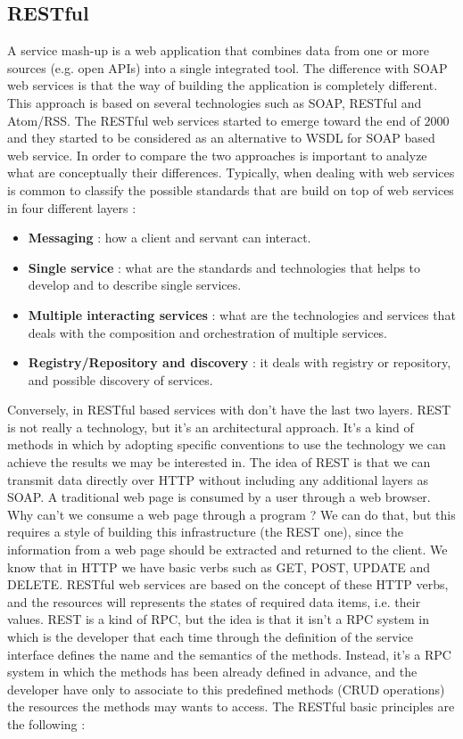 \subsection{RESTful}
A service mash-up is a web application that combines data from one or more sources (e.g. open APIs) into a single integrated tool. The difference with SOAP web services is that the way of building the application is completely different. This approach is based on several technologies such as SOAP, RESTful and Atom/RSS. The RESTful web services started to emerge toward the end of $2000$ and they started to be considered as an alternative to WSDL for SOAP based web service. In order to compare the two approaches is important to analyze what are conceptually their differences. Typically, when dealing with web services is common to classify the possible standards that are build on top of web services in four different layers :
\begin{itemize}
    \item \textbf{Messaging} : how a client and servant can interact.
    \item \textbf{Single service} : what are the standards and technologies that helps to develop and to describe single services.
    \item \textbf{Multiple interacting services} : what are the technologies and services that deals with the composition and orchestration of multiple services.
    \item \textbf{Registry/Repository and discovery} : it deals with registry or repository, and possible discovery of services.
\end{itemize}
Conversely, in RESTful based services with don't have the last two layers. REST is not really a technology, but it's an architectural approach. It's a kind of methods in which by adopting specific conventions to use the technology we can achieve the results we may be interested in. The idea of REST is that we can transmit data directly over HTTP without including any additional layers as SOAP. A traditional web page is consumed by a user through a web browser. Why can't we consume a web page through a program ? We can do that, but this requires a style of building this infrastructure (the REST one), since the information from a web page should be extracted and returned to the client. We know that in HTTP we have basic verbs such as GET, POST, UPDATE and DELETE. RESTful web services are based on the concept of these HTTP verbs, and the resources will represents the states of required data items, i.e. their values. REST is a kind of RPC, but the idea is that it isn't a RPC system in which is the developer that each time through the definition of the service interface defines the name and the semantics of the methods. Instead, it's a RPC system in which the methods has been already defined in advance, and the developer have only to associate to this predefined methods (CRUD operations) the resources the methods may wants to access. The RESTful basic principles are the following :
